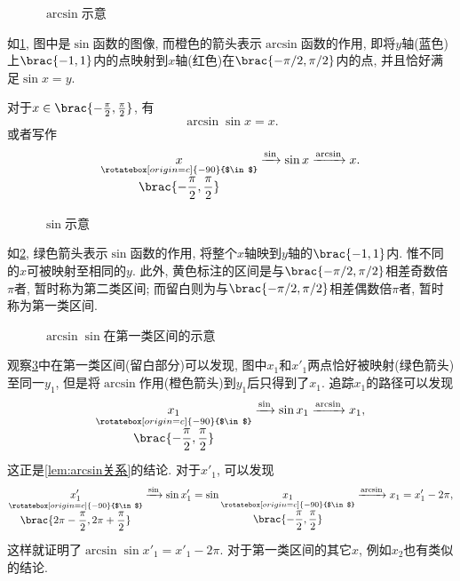 \documentclass{ctexart}
\begin{document}
\begin{figure}[ht]
    \centering
    \caption{$\arcsin$示意}
    \label{fig:arcsin示意}
\end{figure}
如\cref{fig:arcsin示意}, 图中是$\sin$函数的图像, 而橙色的箭头表示$\arcsin$函数的作用, 即将$y$轴(蓝色)上$\brac{-1,1}$内的点映射到$x$轴(红色)在$\brac{-\pi/2,\pi/2}$内的点, 并且恰好满足$\sin x = y$.
\begin{finale}
    \begin{lemma}
        \label{lem:arcsin关系}
        对于$x\in \brac{-\frac{\pi}{2},\frac{\pi}{2}}$, 有
        \[ \arcsin \sin x = x. \]
        或者写作
        \[ \underset{ \underset{\displaystyle \brac{-\frac{\pi}{2},\frac{\pi}{2}}}{\mathbin{\rotatebox[origin=c]{-90}{$\in$}}}}{x} \xrightarrow{\sin} \sin x \xrightarrow{\arcsin} x. \]
    \end{lemma}
\end{finale}    
\begin{figure}[ht]
    \centering
    \caption{$\sin$示意}
    \label{fig:sin示意}
\end{figure}
\par
如\cref{fig:sin示意}, 绿色箭头表示$\sin$函数的作用, 将整个$x$轴映到$y$轴的$\brac{-1,1}$内. 惟不同的$x$可被映射至相同的$y$. 此外, 黄色标注的区间是与$\brac{-\pi/2,\pi/2}$相差奇数倍$\pi$者, 暂时称为第二类区间; 而留白则为与$\brac{-\pi/2,\pi/2}$相差偶数倍$\pi$者, 暂时称为第一类区间.
\begin{figure}[ht]
    \centering
    \caption{$\arcsin\sin$在第一类区间的示意}
    \label{fig:sin第一类示意}
\end{figure}
\par
观察\cref{fig:sin第一类示意}中在第一类区间(留白部分)可以发现, 图中$x_1$和$x'_1$两点恰好被映射(绿色箭头)至同一$y_1$, 但是将$\arcsin$作用(橙色箭头)到$y_1$后只得到了$x_1$. 追踪$x_1$的路径可以发现
\[ \underset{ \underset{\displaystyle \brac{-\frac{\pi}{2},\frac{\pi}{2}}}{\mathbin{\rotatebox[origin=c]{-90}{$\in$}}}}{x_1} \xrightarrow{\sin} \sin x_1 \xrightarrow{\arcsin} x_1, \]
这正是\cref{lem:arcsin关系}的结论. 对于$x'_1$, 可以发现
\[ \underset{ \underset{\displaystyle \brac{2\pi -\frac{\pi}{2},2\pi + \frac{\pi}{2}}}{\mathbin{\rotatebox[origin=c]{-90}{$\in$}}}}{x'_1} \xrightarrow{\sin} \sin x'_1 = \sin \underset{ \underset{\displaystyle \brac{-\frac{\pi}{2},\frac{\pi}{2}}}{\mathbin{\rotatebox[origin=c]{-90}{$\in$}}}}{x_1} \xrightarrow{\arcsin} x_1 = x'_1 - 2\pi, \]
这样就证明了$\arcsin \sin x'_1 = x'_1 - 2\pi$. 对于第一类区间的其它$x$, 例如$x_2$也有类似的结论.
\end{document}
